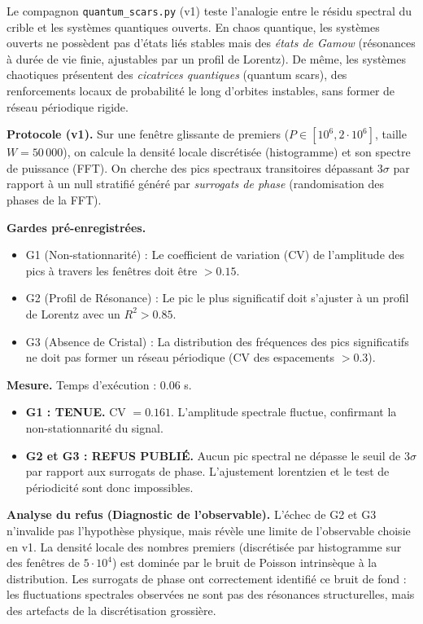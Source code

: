 \documentclass[11pt,a4paper]{article}
\begin{document}
Le compagnon \texttt{quantum\_scars.py} (v1) teste l'analogie entre le résidu spectral du crible et les systèmes quantiques ouverts. En chaos quantique, les systèmes ouverts ne possèdent pas d'états liés stables mais des \textit{états de Gamow} (résonances à durée de vie finie, ajustables par un profil de Lorentz). De même, les systèmes chaotiques présentent des \textit{cicatrices quantiques} (quantum scars), des renforcements locaux de probabilité le long d'orbites instables, sans former de réseau périodique rigide.

\textbf{Protocole (v1).} Sur une fenêtre glissante de premiers ($P \in [10^6, 2 \cdot 10^6]$, taille $W=50\,000$), on calcule la densité locale discrétisée (histogramme) et son spectre de puissance (FFT). On cherche des pics spectraux transitoires dépassant $3\sigma$ par rapport à un null stratifié généré par \textit{surrogats de phase} (randomisation des phases de la FFT).

\textbf{Gardes pré-enregistrées.}
\begin{itemize}
\item G1 (Non-stationnarité) : Le coefficient de variation (CV) de l'amplitude des pics à travers les fenêtres doit être $> 0.15$.
\item G2 (Profil de Résonance) : Le pic le plus significatif doit s'ajuster à un profil de Lorentz avec un $R^2 > 0.85$.
\item G3 (Absence de Cristal) : La distribution des fréquences des pics significatifs ne doit pas former un réseau périodique (CV des espacements $> 0.3$).
\end{itemize}

\textbf{Mesure.} Temps d'exécution : $0.06$ s.
\begin{itemize}
\item \textbf{G1 : TENUE.} CV $= 0.161$. L'amplitude spectrale fluctue, confirmant la non-stationnarité du signal.
\item \textbf{G2 et G3 : REFUS PUBLIÉ.} Aucun pic spectral ne dépasse le seuil de $3\sigma$ par rapport aux surrogats de phase. L'ajustement lorentzien et le test de périodicité sont donc impossibles.
\end{itemize}

\textbf{Analyse du refus (Diagnostic de l'observable).}  
L'échec de G2 et G3 n'invalide pas l'hypothèse physique, mais révèle une limite de l'observable choisie en v1. La densité locale des nombres premiers (discrétisée par histogramme sur des fenêtres de $5 \cdot 10^4$) est dominée par le bruit de Poisson intrinsèque à la distribution. Les surrogats de phase ont correctement identifié ce bruit de fond : les fluctuations spectrales observées ne sont pas des résonances structurelles, mais des artefacts de la discrétisation grossière. 
\end{document}
